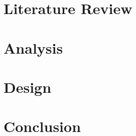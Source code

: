 \documentclass[12pt]{report}
\begin{document}
\chapter{Literature Review}


\chapter{Analysis}

 
\chapter{Design}

 
\chapter{Conclusion}


% 

% 

\printbibliography
\end{document}
